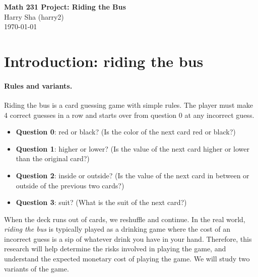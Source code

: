 \documentclass[12pt]{article}
\theoremstyle{definition}
\def \title {Math 231 Project: Riding the Bus}
\def \name {Harry Sha (harry2)}
\def \date {\today}
\begin{document}
\begin{center}
    {\bf \LARGE \title}\\ \vspace{1em}
    \name\\ \vspace{1em}
    \date
\end{center}
\vspace{1em}

\begin{abstract}
    In this paper we explore the mathematics of \textit{riding the bus}, a popular card guessing game. In particular, we aim to compute and estimate the expected number of guesses and failures under different variants of the game and play strategies. We also aim to understand the distribution of guesses and failures in idealized models, and see how well these models correspond to the real world.
\end{abstract}

\vspace{3em}

\section{Introduction: riding the bus}
\paragraph{Rules and variants.}
Riding the bus is a card guessing game with simple rules. The player must make 4 correct guesses in a row and starts over from question 0 at any incorrect guess.
\begin{itemize}
    \item {\bf Question 0}: red or black? (Is the color of the next card red or black?)
    \item {\bf Question 1}: higher or lower? (Is the value of the next card higher or lower than the original card?)
    \item {\bf Question 2}: inside or outside? (Is the value of the next card in between or outside of the previous two cards?)
    \item {\bf Question 3}: suit? (What is the suit of the next card?)
\end{itemize}
When the deck runs out of cards, we reshuffle and continue. In the real world, \emph{riding the bus} is typically played as a drinking game where the cost of an incorrect guess is a sip of whatever drink you have in your hand. Therefore, this research will help determine the risks involved in playing the game, and understand the expected monetary cost of playing the game. We will study two variants of the game.
\end{document}
